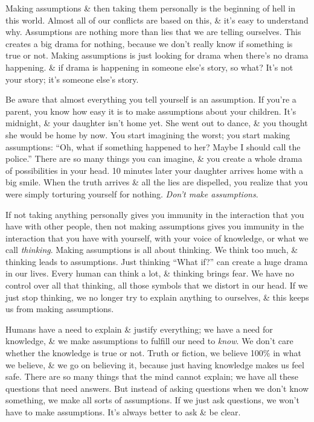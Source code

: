 \documentclass{article}
\numberwithin{equation}{section}
\begin{document}
Making assumptions \& then taking them personally is the beginning of hell in this world. Almost all of our conflicts are based on this, \& it's easy to understand why. Assumptions are nothing more than lies that we are telling ourselves. This creates a big drama for nothing, because we don't really know if something is true or not. Making assumptions is just looking for drama when there's no drama happening. \& if drama is happening in someone else's story, so what? It's not your story; it's someone else's story.

Be aware that almost everything you tell yourself is an assumption. If you're a parent, you know how easy it is to make assumptions about your children. It's midnight, \& your daughter isn't home yet. She went out to dance, \& you thought she would be home by now. You start imagining the worst; you start making assumptions: ``Oh, what if something happened to her? Maybe I should call the police.'' There are so many things you can imagine, \& you create a whole drama of possibilities in your head. 10 minutes later your daughter arrives home with a big smile. When the truth arrives \& all the lies are dispelled, you realize that you were simply torturing yourself for nothing. \textit{Don't make assumptions}.

If not taking anything personally gives you immunity in the interaction that you have with other people, then not making assumptions gives you immunity in the interaction that you have with yourself, with your voice of knowledge, or what we call \textit{thinking}. Making assumptions is all about thinking. We think too much, \& thinking leads to assumptions. Just thinking ``What if?'' can create a huge drama in our lives. Every human can think a lot, \& thinking brings fear. We have no control over all that thinking, all those symbols that we distort in our head. If we just stop thinking, we no longer try to explain anything to ourselves, \& this keeps us from making assumptions.

Humans have a need to explain \& justify everything; we have a need for knowledge, \& we make assumptions to fulfill our need to \textit{know}. We don't care whether the knowledge is true or not. Truth or fiction, we believe 100\% in what we believe, \& we go on believing it, because just having knowledge makes us feel safe. There are so many things that the mind cannot explain; we have all these questions that need answers. But instead of asking questions when we don't know something, we make all sorts of assumptions. If we just ask questions, we won't have to make assumptions. It's always better to ask \& be clear.
\end{document}
